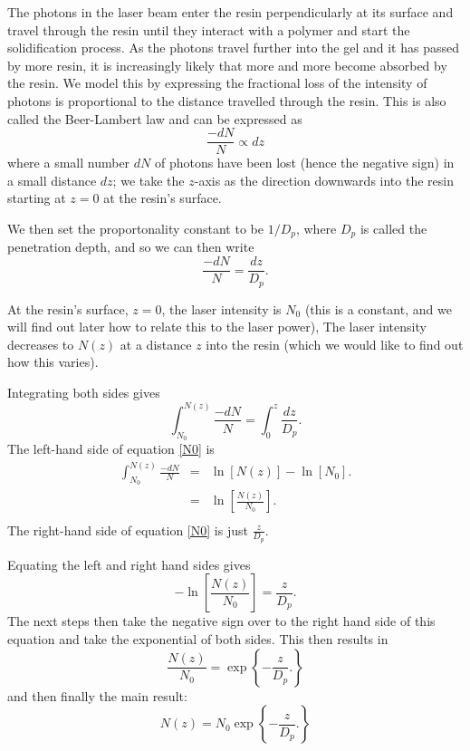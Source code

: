 The photons in the laser beam enter the resin perpendicularly at its surface and travel through the resin until they interact with a polymer and start the solidification process. As the photons travel further into the gel and it has passed by more resin, it is increasingly likely that more and more become absorbed by the resin. We model this by expressing the fractional loss of the intensity  of photons is proportional to the distance travelled through the resin. This is also called the Beer-Lambert law and can be expressed as 
\begin{equation}
\frac{- dN}{N} \propto dz
\end{equation}
where a small number $dN$ of photons have been lost (hence the negative sign) in a small distance $dz$; we take the $z$-axis as the direction downwards into the resin starting at $z=0$ at the resin's surface. 

We then set the proportonality constant to be $1 / D_{p}$, where $D_{p}$ is called the penetration depth, and so we can then write 
\begin{equation}
\frac{- dN}{N} = \frac{dz}{D_{p}}. 
\end{equation}

At the resin's surface, $z=0$, the laser intensity is $N_{0}$ (this is a constant, and we will find out later how to relate this to the laser power), The laser intensity decreases to $N\left(z\right)$ at a distance $z$ into the resin (which we would like to find out how this varies). 

Integrating both sides gives 
\begin{equation}
\int_{N_{0}}^{N\left(z\right)} \frac{- dN}{N} = \int_{0}^{z} \frac{dz}{D_{p}}. 
\label{N0}
\end{equation}
The left-hand side of equation \ref{N0} is 
\begin{eqnarray}
\int_{N_{0}}^{N\left(z\right)} \frac{- dN}{N} & = & \ln \left[ N\left(z\right)\right]  - \ln \left[ N_{0} \right]. \\
& = & \ln \left[ \frac{N\left(z\right)}{ N_{0} } \right]. \\
\end{eqnarray}
The right-hand side of equation \ref{N0} is just $\frac{z}{D_{p}}$. 

Equating the left and right hand sides gives 
\begin{equation}
 - \ln \left[ \frac{N\left(z\right)}{ N_{0} } \right] = \frac{z}{D_{p}}. 
\end{equation}
The next steps then take the negative sign over to the right hand side of this equation and take the exponential of both sides. This then results in 
\begin{equation}
\frac{N\left(z\right)}{ N_{0} } = \exp \left\{ - \frac{z}{D_{p}}. \right\}
\end{equation}
and then finally the main result: 
\begin{equation}
N\left(z\right)  = N_{0} \exp \left\{ - \frac{z}{D_{p}}. \right\}
\end{equation}

